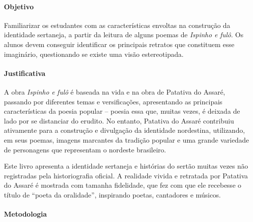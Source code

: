 \documentclass[12pt]{extarticle}
\begin{document}
\paragraph{Objetivo} Familiarizar os estudantes com as características envoltas na construção da 
identidade sertaneja, a partir da leitura de alguns poemas de \emph{Ispinho e fulô}.
Os alunos devem conseguir identificar os principais retratos que constituem esse imaginário, 
questionando se existe uma visão estereotipada. 


\paragraph{Justificativa} A obra \emph{Ispinho e fulô} é baseada na vida e na obra de
Patativa do Assaré, passando por diferentes temas e versificações,
apresentando as principais características da poesia popular -- poesia
essa que, muitas vezes, é deixada de lado por se distanciar do erudito.
No entanto, Patativa do Assaré contribuiu ativamente para a construção e
divulgação da identidade nordestina, utilizando, em seus poemas, imagens
marcantes da tradição popular e uma grande variedade de personagens que
representam o nordeste brasileiro.

Este livro apresenta a identidade sertaneja e histórias do sertão muitas
vezes não registradas pela historiografia oficial. A realidade vivida e
retratada por Patativa do Assaré é mostrada com tamanha fidelidade, que
fez com que ele recebesse o título de ``poeta da oralidade'', inspirando
poetas, cantadores e músicos.

\paragraph{Metodologia}
\end{document}
